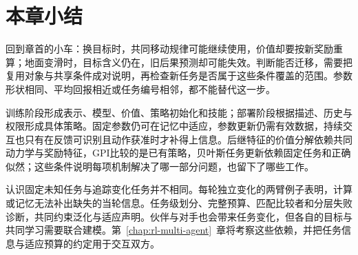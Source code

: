 \section{本章小结}
\label{sec:rl-transfer-summary}

回到章首的小车：换目标时，共同移动规律可能继续使用，价值却要按新奖励重算；地面变滑时，目标含义仍在，旧后果预测却可能失效。判断能否迁移，需要把复用对象与共享条件成对说明，再检查新任务是否属于这些条件覆盖的范围。参数形状相同、平均回报相近或任务编号相邻，都不能替代这一步。

训练阶段形成表示、模型、价值、策略初始化和技能；部署阶段根据描述、历史与权限形成具体策略。固定参数仍可在记忆中适应，参数更新仍需有效数据，持续交互也只有在反馈可识别且动作获准时才补得上信息。后继特征的价值分解依赖共同动力学与奖励特征，GPI比较的是已有策略，贝叶斯任务更新依赖固定任务和正确似然；这些条件说明每项机制解决了哪一部分问题，也留下了哪些工作。

认识固定未知任务与追踪变化任务并不相同。每轮独立变化的两臂例子表明，计算或记忆无法补出缺失的当轮信息。任务级划分、完整预算、匹配比较者和分层失败诊断，共同约束泛化与适应声明。伙伴与对手也会带来任务变化，但各自的目标与共同学习需要联合建模。第~\ref{chap:rl-multi-agent}~章将考察这些依赖，并把任务信息与适应预算的约定用于交互双方。
